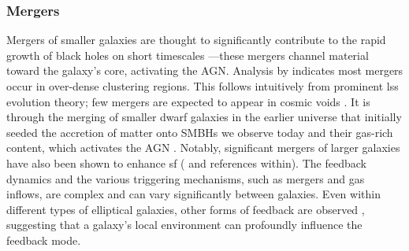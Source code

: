 \subsubsection{Mergers}
Mergers of smaller galaxies are thought to significantly contribute to the rapid growth of black holes on short timescales \citep{kormendy_coevolution_2013}—these mergers channel material toward the galaxy's core, activating the AGN. Analysis by \cite{hopkins_cosmological_2008} indicates most mergers occur in over-dense clustering regions. This follows intuitively from prominent \gls{lss} evolution theory; few mergers are expected to appear in cosmic voids \citep{coil_large-scale_2013}. It is through the merging of smaller dwarf galaxies in the earlier universe that initially seeded the accretion of matter onto SMBHs we observe today \citep{forbes_keckkcwi_2024, ziparo_primordial_2024} and their gas-rich content, which activates the AGN \citep{hopkins_how_2010, hartzenberg_evolved_2023}. Notably, significant mergers of larger galaxies have also been shown to enhance \gls{sf} (\citealp{volonteri_assembly_2003, hopkins_how_2010} and references within). The feedback dynamics and the various triggering mechanisms, such as mergers and gas inflows, are complex and can vary significantly between galaxies. Even within different types of elliptical galaxies, other forms of feedback are observed \citep{kormendy_coevolution_2013}, suggesting that a galaxy's local environment can profoundly influence the feedback mode. 

